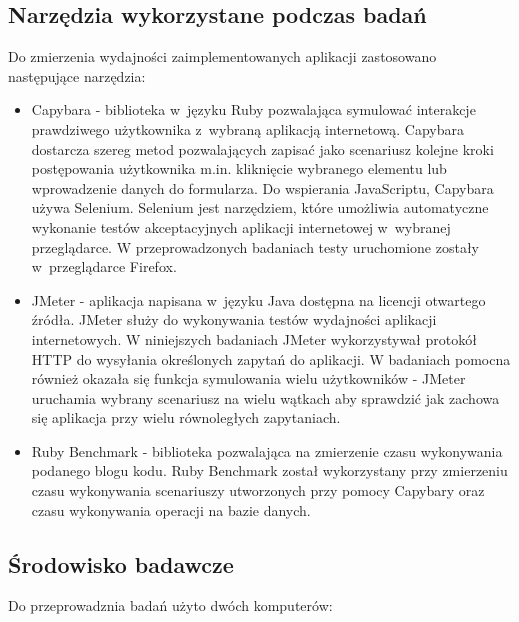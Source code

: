 \documentclass[printmode]{mgr}
\begin{document}
\subsection{Narzędzia wykorzystane podczas badań}
Do zmierzenia wydajności zaimplementowanych aplikacji zastosowano następujące narzędzia:
\begin{itemize}
  \item{Capybara} - biblioteka w~języku Ruby pozwalająca symulować interakcje prawdziwego użytkownika z~wybraną aplikacją internetową. Capybara dostarcza szereg metod pozwalających zapisać jako scenariusz kolejne kroki postępowania użytkownika m.in. kliknięcie wybranego elementu lub wprowadzenie danych do formularza. Do wspierania JavaScriptu, Capybara używa Selenium. Selenium jest narzędziem, które umożliwia automatyczne wykonanie testów akceptacyjnych aplikacji internetowej w~wybranej przeglądarce. W przeprowadzonych badaniach testy uruchomione zostały w~przeglądarce Firefox. \cite{doc_capybara}
  \item{JMeter} - aplikacja napisana w~języku Java dostępna na licencji otwartego źródła. JMeter służy do wykonywania testów wydajności aplikacji internetowych. W niniejszych badaniach JMeter wykorzystywał protokół HTTP do wysyłania określonych zapytań do aplikacji. W badaniach pomocna również okazała się funkcja symulowania wielu użytkowników - JMeter uruchamia wybrany scenariusz na wielu wątkach aby sprawdzić jak zachowa się aplikacja przy wielu równoległych zapytaniach. \cite{doc_jmeter}
  \item{Ruby Benchmark} - biblioteka pozwalająca na zmierzenie czasu wykonywania podanego blogu kodu. Ruby Benchmark został wykorzystany przy zmierzeniu czasu wykonywania scenariuszy utworzonych przy pomocy Capybary oraz czasu wykonywania operacji na bazie danych. \cite{doc_benchmark}
\end{itemize}

\subsection{Środowisko badawcze}

Do przeprowadznia badań użyto dwóch komputerów:
\end{document}
